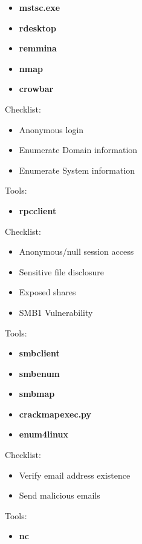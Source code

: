 \documentclass[a4paper,10pt]{article}
\begin{document}
\begin{multicols}{2}
\begin{tcolorbox}[breakable, title=RDP]
\begin{itemize}
	\itemsep0em
	\item \textbf{mstsc.exe}
	\item \textbf{rdesktop}
	\item \textbf{remmina}
	\item \textbf{nmap}
	\item \textbf{crowbar}
\end{itemize}
\end{tcolorbox}
\begin{tcolorbox}[breakable, title=RPC]
Checklist:
\begin{itemize}
	\itemsep0em
	\item Anonymous login
	\item Enumerate Domain information
	\item Enumerate System information
\end{itemize}
Tools:
\begin{itemize}
	\itemsep0em
	\item \textbf{rpcclient}
\end{itemize}
\end{tcolorbox}
\begin{tcolorbox}[breakable, title=SMB]
Checklist:
\begin{itemize}
	\itemsep0em
	\item Anonymous/null session access
	\item Sensitive file disclosure
	\item Exposed shares
	\item SMB1 Vulnerability
\end{itemize}
Tools:
\begin{itemize}
	\itemsep0em
	\item \textbf{smbclient}
	\item \textbf{smbenum}
	\item \textbf{smbmap}
	\item \textbf{crackmapexec.py}
	\item \textbf{enum4linux}
\end{itemize}
\end{tcolorbox}
\begin{tcolorbox}[breakable, title=SMTP]
Checklist:
\begin{itemize}
	\itemsep0em
	\item Verify email address existence
	\item Send malicious emails
\end{itemize}
Tools:
\begin{itemize}
	\itemsep0em
	\item \textbf{nc}

\end{itemize}
\end{tcolorbox}
\end{multicols}
\end{document}

